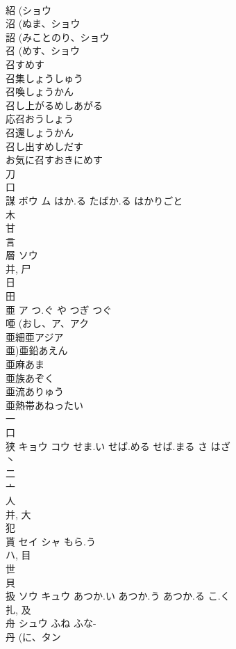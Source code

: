 \documentclass[8pt]{extreport}
\begin{document}
\begin{CJK}{UTF8}{min}
\\	紹 (ショウ 
\\	沼 (ぬま、ショウ 
\\	詔 (みことのり、ショウ 
\\	召 (めす、ショウ 
\\	召すめす
\\	召集しょうしゅう
\\	召喚しょうかん
\\	召し上がるめしあがる
\\	応召おうしょう
\\	召還しょうかん
\\	召し出すめしだす
\\	お気に召すおきにめす
\\	刀 
\\	口 
\\	謀	ボウ ム	はか.る たばか.る はかりごと	
\\	木 
\\	甘 
\\	言 
\\	層	ソウ		
\\	并, 尸 
\\	日 
\\	田 
\\	亜	ア	つ.ぐ や つぎ つぐ	
\\	唖 (おし、ア、アク 
\\	亜細亜アジア
\\	亜)亜鉛あえん
\\	亜麻あま
\\	亜族あぞく
\\	亜流ありゅう
\\	亜熱帯あねったい 
\\	一 
\\	口 
\\	狭	キョウ コウ	せま.い せば.める せば.まる さ はざ	
\\	丶 
\\	二 
\\	亠 
\\	人 
\\	并, 大 
\\	犯 
\\	貰	セイ シャ	もら.う	
\\	ハ, 目 
\\	世 
\\	貝 
\\	扱	ソウ キュウ	あつか.い あつか.う あつか.る こ.く	
\\	扎, 及 
\\	舟	シュウ	ふね ふな-	
\\	丹 (に、タン 

\end{CJK}
\end{document}
